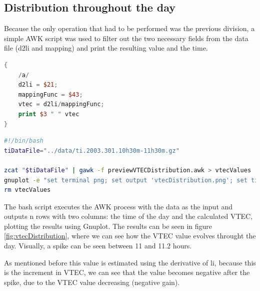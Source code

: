 \subsection{Distribution throughout the day}

Because the only operation that had to be performed was the previous division, a simple AWK script was used to filter out the two necessary fields from the data file (d2li and  mapping) and print the resulting value and the time. 

\begin{lstlisting}[language=Awk, caption=process]
{
	/a/
	d2li = $21;
	mappingFunc = $43;
	vtec = d2li/mappingFunc;
	print $3 " " vtec
}
\end{lstlisting}

\begin{lstlisting}[language=Bash, caption=Bash script to execute the procedures]
#!/bin/bash
tiDataFile="../data/ti.2003.301.10h30m-11h30m.gz"

zcat "$tiDataFile" | gawk -f previewVTECDistribution.awk > vtecValues
gnuplot -e "set terminal png; set output 'vtecDistribution.png'; set title 'VTEC Distribution'; set xlabel 'Time of the day (hours)'; set ylabel 'VTEC'; set grid; plot \"vtecValues\" using 1:2 with point"
rm vtecValues
\end{lstlisting}
\clearpage

The bash script executes the AWK process with the data as the input and outputs n rows with two columns: the time of the day and the calculated VTEC, plotting the results using Gnuplot.
The results can be seen in figure \ref{fig:vtecDistribution}, where we can see how the VTEC value evolves throught the day. Visually, a spike can be seen between 11 and 11.2 hours. 

As mentioned before this value is estimated using the derivative of li, because this is the increment in VTEC, we can see that the value becomes negative after the spike, due to the VTEC value decreasing (negative gain).

